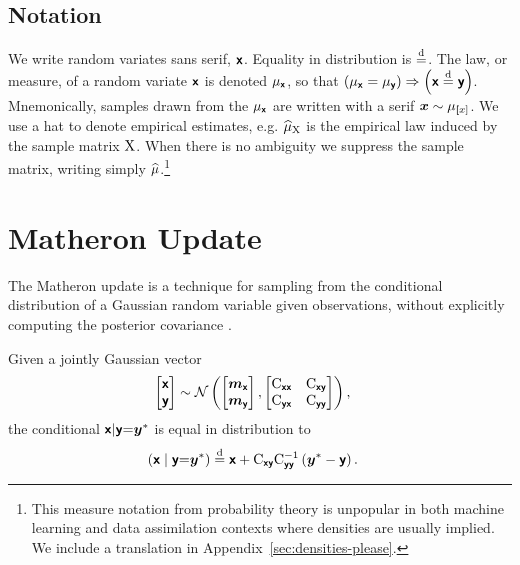 \documentclass[wcp]{jmlr} %
\begin{document}
\subsection{Notation}

We write random variates sans serif, $\boldsymbol{\mathsf{x}}$.
Equality in distribution is $\stackrel{\mathrm{d}}{=}$.
The law, or measure, of a random variate $\boldsymbol{\mathsf{x}}$ is denoted $\Law[\vrv{x}]$,
so that $\left(\Law[\vrv{x}]=\Law[\vrv{y}]\right) \Rightarrow \left(\vrv{x}\disteq\vrv{y}\right)$.
Mnemonically, samples drawn from the $\Law[\vrv{x}]$ are written with a serif $\vv{x}\sim\Law[\vrv[x]]$.
We use a hat to denote empirical estimates, e.g. \(\ELaw[\mm{X}]\) is the empirical law induced by the sample matrix \(\mathrm{X}\).
When there is no ambiguity we suppress the sample matrix, writing simply \(\widehat{\Law}\).\footnote{This measure notation from probability theory is unpopular in both machine learning and data assimilation contexts where densities are usually implied.
We include a translation in Appendix~\ref{sec:densities-please}.}

\section{Matheron Update}

The Matheron update is a technique for sampling from the conditional distribution of a Gaussian random variable given observations, without explicitly computing the posterior covariance \citep{Doucet2010Note,Wilson2020Efficiently,Wilson2021Pathwise}.

\begin{lemma}
Given a jointly Gaussian vector
\begin{align}
    \begin{bmatrix} \boldsymbol{\mathsf{x}} \\ \boldsymbol{\mathsf{y}} \end{bmatrix}
    &\sim \mathcal{N}\left(\begin{bmatrix} \boldsymbol{m}_{\boldsymbol{\mathsf{x}}} \\ \boldsymbol{m}_{\boldsymbol{\mathsf{y}}} \end{bmatrix}, \begin{bmatrix} \mathrm{C}_{\boldsymbol{\mathsf{xx}}} & \mathrm{C}_{\boldsymbol{\mathsf{xy}}} \\ \mathrm{C}_{\boldsymbol{\mathsf{yx}}} & \mathrm{C}_{\boldsymbol{\mathsf{yy}}} \end{bmatrix}\right), \label{eq:joint-gaussian}
\end{align}
the conditional $\boldsymbol{\mathsf{x}} | \boldsymbol{\mathsf{y}} {=} \boldsymbol{y}^*$ is equal in distribution to
\begin{align}
    \left(\boldsymbol{\mathsf{x}} \mid \boldsymbol{\mathsf{y}} {=} \boldsymbol{y}^*\right)
    &\stackrel{\mathrm{d}}{=} \boldsymbol{\mathsf{x}} + \mathrm{C}_{\boldsymbol{\mathsf{xy}}} \mathrm{C}_{\boldsymbol{\mathsf{yy}}}^{-1} \left( \boldsymbol{y}^* - \boldsymbol{\mathsf{y}} \right).
    \label{eq:matheron-update}
\end{align}
\end{lemma}
\end{document}
